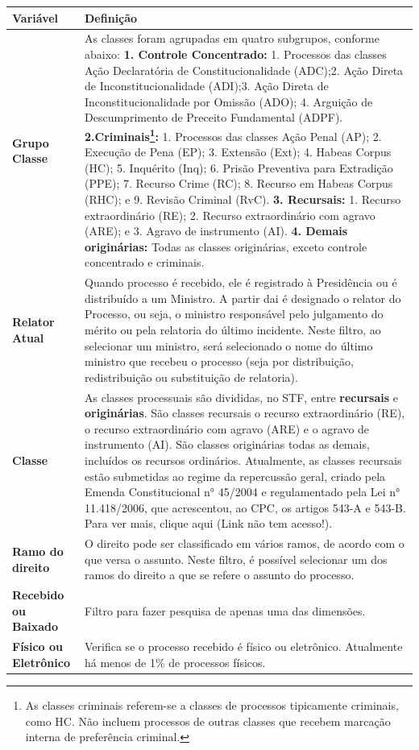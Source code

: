 \documentclass[
]{book}
\begin{document}
\begin{longtable}[]{@{}
  >{\raggedright\arraybackslash}p{}
  >{\raggedright\arraybackslash}p{}@{}}
\toprule
Variável & Definição \\
\midrule
\endhead
\textbf{Grupo Classe} & As classes foram agrupadas em quatro subgrupos, conforme abaixo: \textbf{1. Controle Concentrado:} 1. Processos das classes Ação Declaratória de Constitucionalidade (ADC);2. Ação Direta de Inconstitucionalidade (ADI);3. Ação Direta de Inconstitucionalidade por Omissão (ADO); 4. Arguição de Descumprimento de Preceito Fundamental (ADPF). \textbf{2.Criminais\footnote{As classes criminais referem-se a classes de processos tipicamente criminais, como HC. Não incluem processos de outras classes que recebem marcação interna de preferência criminal.}:} 1. Processos das classes Ação Penal (AP); 2. Execução de Pena (EP); 3. Extensão (Ext); 4. Habeas Corpus (HC); 5. Inquérito (Inq); 6. Prisão Preventiva para Extradição (PPE); 7. Recurso Crime (RC); 8. Recurso em Habeas Corpus (RHC); e 9. Revisão Criminal (RvC). \textbf{3. Recursais:} 1. Recurso extraordinário (RE); 2. Recurso extraordinário com agravo (ARE); e 3. Agravo de instrumento (AI). \textbf{4. Demais originárias:} Todas as classes originárias, exceto controle concentrado e criminais. \\
\textbf{Relator Atual} & Quando processo é recebido, ele é registrado à Presidência ou é distribuído a um Ministro. A partir dai é designado o relator do Processo, ou seja, o ministro responsável pelo julgamento do mérito ou pela relatoria do último incidente. Neste filtro, ao selecionar um ministro, será selecionado o nome do último ministro que recebeu o processo (seja por distribuição, redistribuição ou substituição de relatoria). \\
\textbf{Classe} & As classes processuais são divididas, no STF, entre \textbf{recursais} e \textbf{originárias}. São classes recursais o recurso extraordinário (RE), o recurso extraordinário com agravo (ARE) e o agravo de instrumento (AI). São classes originárias todas as demais, incluídos os recursos ordinários. Atualmente, as classes recursais estão submetidas ao regime da repercussão geral, criado pela Emenda Constitucional n° 45/2004 e regulamentado pela Lei n° 11.418/2006, que acrescentou, ao CPC, os artigos 543-A e 543-B. Para ver mais, clique aqui (Link não tem acesso!). \\
\textbf{Ramo do direito} & O direito pode ser classificado em vários ramos, de acordo com o que versa o assunto. Neste filtro, é possível selecionar um dos ramos do direito a que se refere o assunto do processo. \\
\textbf{Recebido ou Baixado} & Filtro para fazer pesquisa de apenas uma das dimensões. \\
\textbf{Físico ou Eletrônico} & Verifica se o processo recebido é físico ou eletrônico. Atualmente há menos de 1\% de processos físicos. \\
\bottomrule
\end{longtable}
\end{document}
